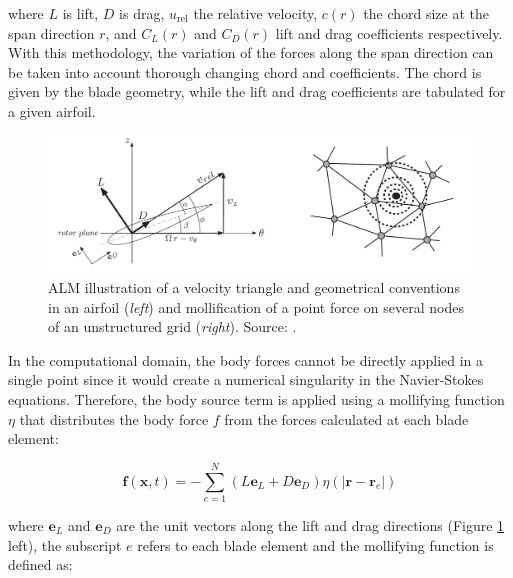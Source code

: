 where $L$ is lift, $D$ is drag, $u_\mathrm{rel}$ the relative velocity, $c \left( r \right)$ the chord size at the span direction $r$, and $C_L \left( r \right)$ and $C_D \left( r \right)$ lift and drag coefficients respectively. With this methodology, the variation of the forces along the span direction can be taken into account thorough changing chord and coefficients. The chord is given by the blade geometry, while the lift and drag coefficients are tabulated for a given airfoil.


\begin{figure}[h!]
	\centering
	\includegraphics[scale=0.4]{./part2_developments/figures_ch4_SLI/ALM_airfoil_and_mollification_benard}
	\caption[ALM illustration of a velocity triangle and geometrical conventions in an airfoil and mollification of a point force on several nodes of an unstructured grid]{ALM illustration of a velocity triangle and geometrical conventions in an airfoil (\textsl{left}) and mollification of a point force on several nodes of an unstructured grid (\textsl{right}). Source: .}
	\label{fig:ALM_airfoil_and_mollification_benard}
\end{figure} 
 

In the computational domain, the body forces cannot be directly applied in a single point since it would create a numerical singularity in the Navier-Stokes equations. Therefore, the body source term is applied using a mollifying function $\eta$ that distributes the body force $f$ from the forces calculated at each blade element:

\begin{equation}
\textbf{f} \left( \textbf{x}, t \right) = - \sum_{e=1}^{N} \left( L \textbf{e}_L + D \textbf{e}_D \right) \eta \left( |\textbf{r} - \textbf{r}_e| \right)
\end{equation}

where $\textbf{e}_L$ and $\textbf{e}_D$ are the unit vectors along the lift and drag directions (Figure \ref{fig:ALM_airfoil_and_mollification_benard} left), the subscript $e$ refers to each blade element and the mollifying function is defined as:

